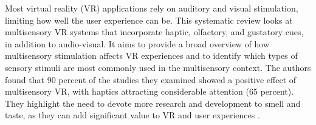 Most virtual reality (VR) applications rely on auditory and visual stimulation, limiting how well the user experience can be. This systematic review looks at multisensory VR systems that incorporate haptic, olfactory, and gustatory cues, in addition to audio-visual. It aims to provide a broad overview of how multisensory stimulation affects VR experiences and to identify which types of sensory stimuli are most commonly used in the multisensory context. The authors found that 90 percent of the studies they examined showed a positive effect of multisensory VR, with haptics attracting considerable attention (65 percent). They highlight the need to devote more research and development to smell and taste, as they can add significant value to VR and user experiences \cite{Apostolou2022AReality}. \\
